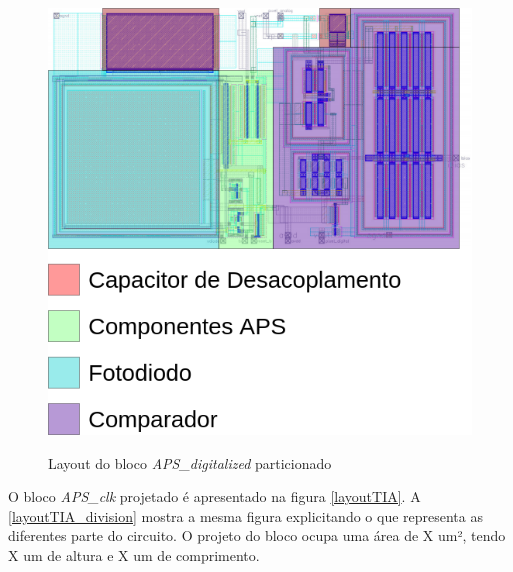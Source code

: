 \begin{figure}[htb]
 \centering
    \centering
    \caption{Layout do bloco \textit{APS\_digitalized} particionado} 
    \includegraphics[scale=0.3]{Resultados/Imagens/Image_APS_Digitalized.png}
    \label{layoutAPSDIG_division}
\end{figure}

O bloco \textit{APS\_clk} projetado é apresentado na figura \autoref{layoutTIA}. A \autoref{layoutTIA_division} mostra a mesma figura explicitando o que representa as diferentes parte do circuito. O projeto do bloco ocupa uma área de X um², tendo X um de altura e X um de comprimento.

